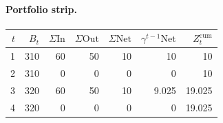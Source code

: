 \documentclass[12pt, a4paper]{article}
\begin{document}
\paragraph{Portfolio strip.}
\begin{center}
\begin{tabular}{rrrrrrr}
\toprule
$t$ & $B_t$ & $\Sigma\mathrm{In}$ & $\Sigma\mathrm{Out}$ & $\Sigma\mathrm{Net}$ & $\gamma^{t-1}\mathrm{Net}$ & $Z_t^{\mathrm{cum}}$\\
\midrule
1 & 310 & 60 & 50 & 10 & 10 & 10 \\
2 & 310 & 0 & 0 & 0 & 0 & 10 \\
3 & 320 & 60 & 50 & 10 & 9.025 & 19.025 \\
4 & 320 & 0 & 0 & 0 & 0 & 19.025 \\
\bottomrule
\end{tabular}
\end{center}
\end{document}
